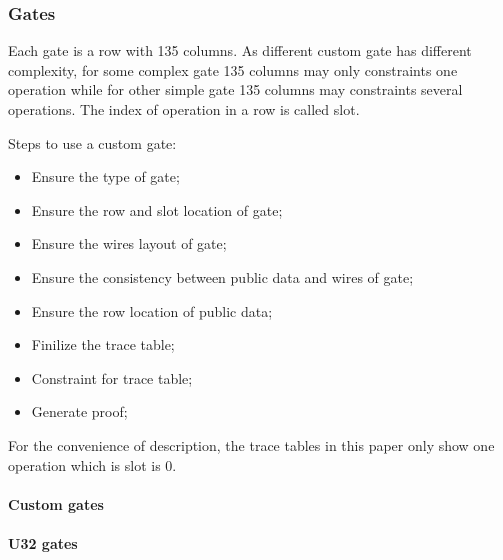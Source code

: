 \subsubsection{Gates} \label{sec:gates}

Each gate is a row with 135 columns. As different custom gate has different complexity, for some complex gate 135 columns may only constraints one
operation while for other simple gate 135 columns may constraints several operations. The index of operation in a row is called slot.

Steps to use a custom gate:
\begin{itemize}
    \item Ensure the type of gate;
    \item Ensure the row and slot location of gate;
    \item Ensure the wires layout of gate;
    \item Ensure the consistency between public data and wires of gate;
    \item Ensure the row location of public data;\
    \item Finilize the trace table;
    \item Constraint for trace table;
    \item Generate proof;
\end{itemize}

For the convenience of description, the trace tables in this paper only show one operation which is slot is 0.

\paragraph{Custom gates}










\paragraph{U32 gates}




